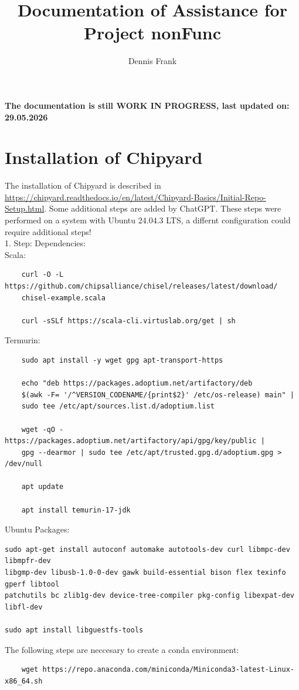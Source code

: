\documentclass{article}
\title{Documentation of Assistance for Project nonFunc}
\author{Dennis Frank}
\date{}
\begin{document}
\maketitle
 {\selectfont
\textbf{The documentation is still WORK IN PROGRESS, last updated on: 29.05.2026}\\
\section*{Installation of Chipyard}
The installation of Chipyard is described in \url{https://chipyard.readthedocs.io/en/latest/Chipyard-Basics/Initial-Repo-Setup.html}. Some additional 
steps are added by ChatGPT. These steps were performed on a system with Ubuntu 24.04.3 LTS, a differnt configuration could require additional steps!\\ 
1. Step: Dependencies:\\
Scala:\\
\begin{verbatim}
    curl -O -L https://github.com/chipsalliance/chisel/releases/latest/download/
    chisel-example.scala

    curl -sSLf https://scala-cli.virtuslab.org/get | sh
\end{verbatim}
Termurin:\\
\begin{verbatim}
    sudo apt install -y wget gpg apt-transport-https

    echo "deb https://packages.adoptium.net/artifactory/deb 
    $(awk -F= '/^VERSION_CODENAME/{print$2}' /etc/os-release) main" | 
    sudo tee /etc/apt/sources.list.d/adoptium.list

    wget -qO - https://packages.adoptium.net/artifactory/api/gpg/key/public | 
    gpg --dearmor | sudo tee /etc/apt/trusted.gpg.d/adoptium.gpg > /dev/null

    apt update

    apt install temurin-17-jdk
\end{verbatim}
Ubuntu Packages:\\
\begin{verbatim}
sudo apt-get install autoconf automake autotools-dev curl libmpc-dev libmpfr-dev 
libgmp-dev libusb-1.0-0-dev gawk build-essential bison flex texinfo gperf libtool 
patchutils bc zlib1g-dev device-tree-compiler pkg-config libexpat-dev libfl-dev

sudo apt install libguestfs-tools 
\end{verbatim}
The following steps are neccesary to create a conda environment:\\
\begin{verbatim}
    wget https://repo.anaconda.com/miniconda/Miniconda3-latest-Linux-x86_64.sh


\end{verbatim}}
\end{document}
